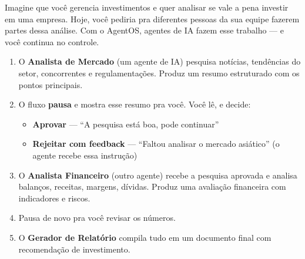 \documentclass[12pt, a4paper]{article}
\begin{document}
Imagine que você gerencia investimentos e quer analisar se vale a pena investir em uma empresa. Hoje, você pediria pra diferentes pessoas da sua equipe fazerem partes dessa análise. Com o AgentOS, agentes de IA fazem esse trabalho --- e você continua no controle.

\vspace{1em}
\begin{center}
\end{center}
\vspace{1em}

\begin{enumerate}[leftmargin=1.5em]
    \item O \textbf{Analista de Mercado} (um agente de IA) pesquisa notícias, tendências do setor, concorrentes e regulamentações. Produz um resumo estruturado com os pontos principais.

    \item O fluxo \textbf{pausa} e mostra esse resumo pra você. Você lê, e decide:
    \begin{itemize}
        \item \textbf{Aprovar} --- ``A pesquisa está boa, pode continuar''
        \item \textbf{Rejeitar com feedback} --- ``Faltou analisar o mercado asiático'' (o agente recebe essa instrução)
    \end{itemize}

    \item O \textbf{Analista Financeiro} (outro agente) recebe a pesquisa aprovada e analisa balanços, receitas, margens, dívidas. Produz uma avaliação financeira com indicadores e riscos.

    \item Pausa de novo pra você revisar os números.

    \item O \textbf{Gerador de Relatório} compila tudo em um documento final com recomendação de investimento.
\end{enumerate}
\end{document}
